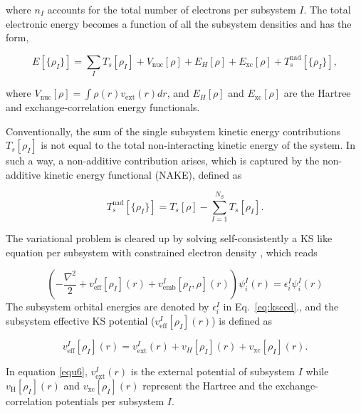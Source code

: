 \documentclass[notitlepage,12pt]{report}
\begin{document}
	where $n_I$ accounts for the total number of electrons per subsystem $I$.
	The total electronic energy becomes a function of all the subsystem densities and has the form,

	\begin{equation}
		E[\{\rho_I\}] = \sum\limits_I T_{s}[\rho_I] + V_{\mathrm{nuc}}[\rho] + E_H[\rho] + E_{\mathrm{xc}}[\rho] + T_{s}^{\mathrm{nad}}[\{\rho_I\}],
	\end{equation}
	
	where $V_{\mathrm{nuc}}[\rho]=\int \rho(r) v_\mathrm{ext}(r)dr$, and $E_H[\rho]$ and $E_{\mathrm{xc}}[\rho]$ are the Hartree  and exchange-correlation energy functionals.
	
	Conventionally, the sum of the single subsystem kinetic energy contributions $T_s[\rho_I]$ is not equal to the total non-interacting kinetic energy of the system. In such a way, a non-additive contribution arises, which is captured by the non-additive kinetic energy functional (NAKE), defined as

	\begin{equation}
		\label{nad}
		T_{s}^{\mathrm{nad}}[\{\rho_{I}\}] = T_{s}[\rho] - \sum\limits_{I=1}^{N_S} T_{s}[\rho_{I}].
	\end{equation}

	The variational problem is cleared up by solving self-consistently a KS like equation per subsystem with constrained electron density \supercite{wesolowski1994ab}, which reads

	\begin{equation}\label{eq:ksced}
		\left( -\frac{\nabla^2}{2} + v_{\mathrm{eff}}^{I}[\rho_I](r) + v_{\mathrm{emb}}^{I}[\rho_{I},\rho](r) \right) \psi_{i}^I(r) = \epsilon_{i}^I \psi_{i}^I(r)
	\end{equation}
	The subsystem orbital energies are denoted by $\epsilon_{i}^I$ in Eq.\ \ref{eq:ksced}.\supercite{sDFT}, and the subsystem effective KS potential ($v_{\mathrm{eff}}^{I}[\rho_I](r)$) is defined as

	\begin{equation}\label{equ6}
		v_{\mathrm{eff}}^{I}[\rho_I](r) = v_{\mathrm{ext}}^I(r) + v_{{H}}[\rho_I](r) + v_{\mathrm{xc}}[\rho_I](r).
	\end{equation}

	In equation \ref{equ6},  $v_{\mathrm{ext}}^I(r)$ is the  external potential of subsystem $I$ while $v_{\mathrm{H}}[\rho_I](r)$ and $v_{\mathrm{xc}}[\rho_I](r)$ represent the Hartree and the exchange-correlation potentials per subsystem $I$.
\end{document}
